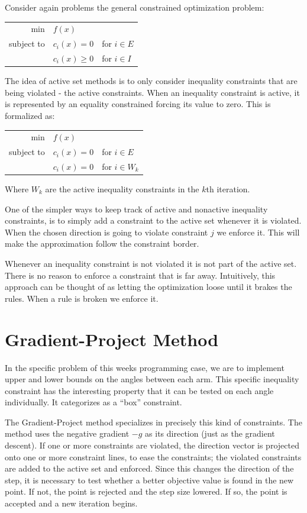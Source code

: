 \documentclass[10pt,oneside,a4paper,final,english]{memoir}
\begin{document}
Consider again problems the general constrained optimization problem:
\begin{center}\begin{tabular}{rll}
min & $f(x)$ & \\
subject to & $c_i(x) = 0$    & for $i \in E$\\
           & $c_i(x) \geq 0$ & for $i \in I$
\end{tabular}\end{center}

The idea of active set methods is to only consider inequality
constraints that are being violated - the active
constraints. When an inequality constraint is active, it is
represented by an equality constrained forcing its value to zero. This
is formalized as:
\begin{center}\begin{tabular}{rll}
min & $f(x)$ & \\
subject to & $c_i(x) = 0$    & for $i \in E$\\
           & $c_i(x) = 0$ & for $i \in W_k$
\end{tabular}\end{center}
Where $W_k$ are the active inequality constraints in the $k$th
iteration.

One of the simpler ways to keep track of active and nonactive
inequality constraints, is to simply add a constraint to the active
set whenever it is violated. When the chosen direction is going to
violate constraint $j$ we enforce it. This will make the approximation
follow the constraint border.

Whenever an inequality constraint is not violated it is not part of
the active set. There is no reason to enforce a constraint that is far
away. Intuitively, this approach can be thought of as letting the
optimization loose until it brakes the rules. When a rule is broken we
enforce it.


\section{Gradient-Project Method}
In the specific problem of this weeks programming case, we are to
implement upper and lower bounds on the angles between each arm. This
specific inequality constraint has the interesting property that it
can be tested on each angle individually. It categorizes as a ``box''
constraint.

The Gradient-Project method specializes in precisely this kind of
constraints. The method uses the negative gradient $-g$ as its
direction (just as the gradient descent). If one or more constraints
are violated, the direction vector is projected onto one or more
constraint lines, to ease the constraints; the violated constraints
are added to the active set and enforced. Since this changes the
direction of the step, it is necessary to test whether a better
objective value is found in the new point. If not, the point is
rejected and the step size lowered. If so, the point is accepted and a
new iteration begins.
\end{document}
